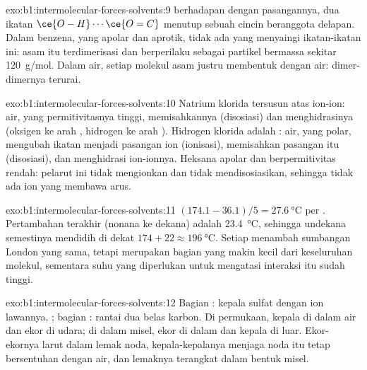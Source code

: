 \begin{solution}{exo:b1:intermolecular-forces-solvents:9}
 berhadapan dengan pasangannya,
dua ikatan $\ce{O-H}\cdots\ce{O=C}$ menutup sebuah cincin beranggota
delapan. Dalam benzena, yang apolar dan aprotik, tidak ada yang menyaingi
ikatan-ikatan ini: asam itu terdimerisasi dan berperilaku sebagai partikel
bermassa sekitar \qty{120}{g/mol}. Dalam air, setiap molekul asam justru
membentuk  dengan air: dimer-dimernya terurai.
\end{solution}

\begin{solution}{exo:b1:intermolecular-forces-solvents:10}
Natrium klorida tersusun atas ion-ion: air, yang permitivitasnya tinggi,
memisahkannya (disosiasi) dan menghidrasinya (oksigen ke arah ,
hidrogen ke arah ). Hidrogen klorida adalah : air,
yang polar, mengubah ikatan  menjadi pasangan ion 
(ionisasi), memisahkan pasangan itu (disosiasi), dan menghidrasi
ion-ionnya. Heksana apolar dan berpermitivitas rendah: pelarut ini tidak
mengionkan dan tidak mendisosiasikan, sehingga tidak ada ion yang
membawa arus.
\end{solution}

\begin{solution}{exo:b1:intermolecular-forces-solvents:11}
$(174.1 - 36.1)/5 = \qty{27.6}{\celsius}$ per . Pertambahan
terakhir (nonana ke dekana) adalah \qty{23.4}{\celsius}, sehingga undekana
semestinya mendidih di dekat $174 + 22 \approx \qty{196}{\celsius}$.
Setiap  menambah sumbangan London yang sama, tetapi merupakan
bagian yang makin kecil dari keseluruhan molekul, sementara suhu yang
diperlukan untuk mengatasi interaksi itu sudah tinggi.
\end{solution}

\begin{solution}{exo:b1:intermolecular-forces-solvents:12}
Bagian : kepala sulfat  dengan ion lawannya,
; bagian : rantai dua belas karbon. Di permukaan,
kepala di dalam air dan ekor di udara; di dalam misel, ekor di dalam dan
kepala di luar. Ekor-ekornya larut dalam lemak noda, kepala-kepalanya
menjaga noda itu tetap bersentuhan dengan air, dan lemaknya terangkat
dalam bentuk misel.
\end{solution}

